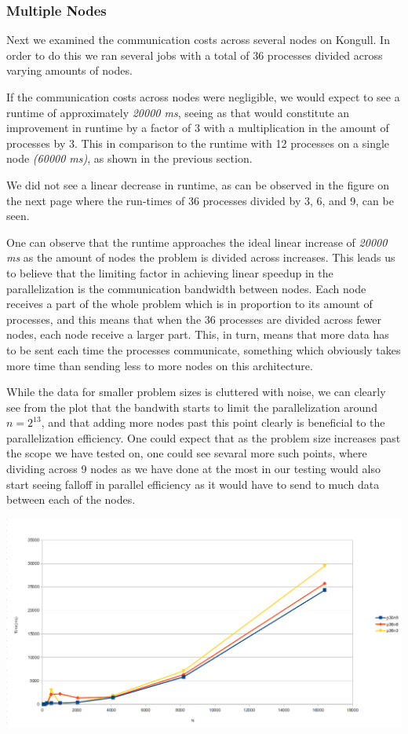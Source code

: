 \documentclass[fontsize=11pt,paper=a4,titlepage]{article}
\begin{document}
\subsubsection{Multiple Nodes}

Next we examined the communication costs across several nodes on Kongull. In
order to do this we ran several jobs with a total of 36 processes divided across
varying amounts of nodes.

If the communication costs across nodes were negligible, we would expect to see
a runtime of approximately \emph{20000 ms}, seeing as that would constitute an
improvement in runtime by a factor of 3 with a multiplication in the amount of
processes by 3. This in comparison to the runtime with 12 processes on a single
node \emph{(60000 ms)}, as shown in the previous section.

We did not see a linear decrease in runtime, as can be observed in the figure
on the next page where the run-times of 36 processes divided by 3, 6, and 9, can
be seen.

One can observe that the runtime approaches the ideal linear increase of
\emph{20000 ms} as the amount of nodes the problem is divided across increases.
This leads us to believe that the limiting factor in achieving linear speedup in
the parallelization is the communication bandwidth between nodes. Each node
receives a part of the whole problem which is in proportion to its amount of
processes, and this means that when the 36 processes are divided across fewer
nodes, each node receive a larger part. This, in turn, means that more data has
to be sent each time the processes communicate, something which obviously takes
more time than sending less to more nodes on this architecture.

While the data for smaller problem sizes is cluttered with noise, we can clearly see from the plot that the bandwith starts to limit the parallelization around $n = 2^{13}$, and that adding more nodes past this point clearly is beneficial to the parallelization efficiency. One could expect that as the problem size increases past the scope we have tested on, one could see sevaral more such points, where dividing across 9 nodes as we have done at the most in our testing would also start seeing falloff in parallel efficiency as it would have to send to much data between each of the nodes.

\hspace*{-1.5cm}\includegraphics[scale=0.6]{pics/p36nX.png}
\end{document}

